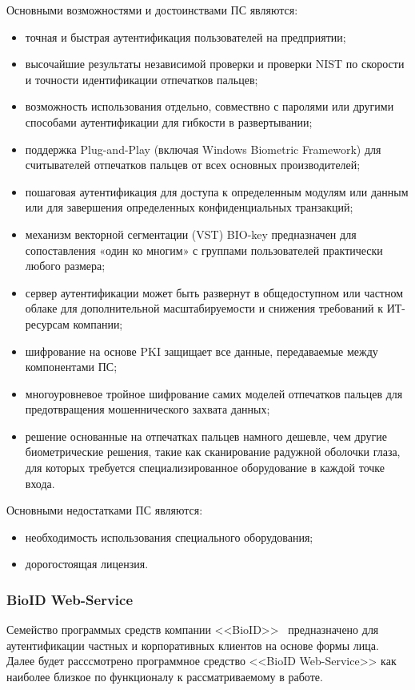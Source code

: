 Основными возможностями и достоинствами ПС являются:
\begin{itemize}
  \item точная и быстрая аутентификация пользователей на предприятии;
  \item высочайшие результаты независимой проверки и проверки NIST по скорости и точности идентификации отпечатков пальцев;
  \item возможность использования отдельно, совмествно с паролями или другими способами аутентификации для гибкости в развертывании;
  \item поддержка Plug-and-Play (включая Windows Biometric Framework) для считывателей отпечатков пальцев от всех основных производителей;
  \item пошаговая аутентификация для доступа к определенным модулям или данным или для завершения определенных конфиденциальных транзакций;
  \item механизм векторной сегментации (VST) BIO-key предназначен для сопоставления «один ко многим» с группами пользователей практически любого размера;
  \item сервер аутентификации может быть развернут в общедоступном или частном облаке для дополнительной масштабируемости и снижения требований к ИТ-ресурсам компании;
  \item шифрование на основе PKI защищает все данные, передаваемые между компонентами ПС;
  \item многоуровневое тройное шифрование самих моделей отпечатков пальцев для предотвращения мошеннического захвата данных;
  \item решение основанные на отпечатках пальцев намного дешевле, чем другие биометрические решения, такие как сканирование радужной оболочки глаза, для которых требуется специализированное оборудование в каждой точке входа.
\end{itemize}

Основными недостатками ПС являются:
\begin{itemize}
  \item необходимость использования специального оборудования;
  \item дорогостоящая лицензия.
\end{itemize}

\subsubsection{BioID Web-Service}
\label{sub:domain:analogs:bioId}
Семейство программых средств компании <<BioID>>~\cite{analogs_bioid} предназначено для аутентификации частных и корпоративных клиентов на основе формы лица. Далее будет расссмотрено программное средство <<BioID Web-Service>> как наиболее близкое по функционалу к рассматриваемому в работе.

